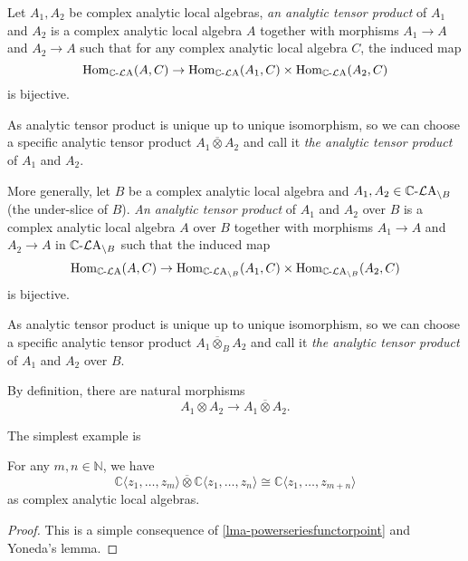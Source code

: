 \begin{definition}\label{def-analytictensor}
    Let $A_1,A_2$ be complex analytic local algebras, \emph{an analytic tensor product} of $A_1$ and $A_2$ is a complex analytic local algebra $A$ together with morphisms $A_1\rightarrow A$ and $A_2\rightarrow A$ such that for any complex analytic local algebra $C$, the induced map
    \[
      \operatorname{Hom}_{\mathbb{C}\text{-}\mathcal{L}\mathrm{A}}(A,C)\rightarrow  \operatorname{Hom}_{\mathbb{C}\text{-}\mathcal{L}\mathrm{A}}(A_1,C)\times  \operatorname{Hom}_{\mathbb{C}\text{-}\mathcal{L}\mathrm{A}}(A_2,C)
    \]
    is bijective.

    As analytic tensor product is unique up to unique isomorphism, so we can choose a specific analytic tensor product $A_1\overline{\otimes} A_2$ and call it \emph{the analytic tensor product} of $A_1$ and $A_2$.

    More generally, let $B$ be a complex analytic local algebra and $A_1,A_2\in \mathbb{C}\text{-}\mathcal{L}\mathrm{A}_{\backslash B}$ (the under-slice of $B$).
    \emph{An analytic tensor product} of $A_1$ and $A_2$ over $B$ is a complex analytic local algebra $A$ over $B$ together with morphisms $A_1\rightarrow A$ and $A_2\rightarrow A$ in $\mathbb{C}\text{-}\mathcal{L}\mathrm{A}_{\backslash B}$ such that the induced map
    \[
      \operatorname{Hom}_{\mathbb{C}\text{-}\mathcal{L}\mathrm{A}}(A,C)\rightarrow  \operatorname{Hom}_{\mathbb{C}\text{-}\mathcal{L}\mathrm{A}_{\backslash B}}(A_1,C)\times \operatorname{Hom}_{\mathbb{C}\text{-}\mathcal{L}\mathrm{A}_{\backslash B}}(A_2,C)
    \]
    is bijective.
    
    As analytic tensor product is unique up to unique isomorphism, so we can choose a specific analytic tensor product $A_1\overline{\otimes}_B A_2$ and call it \emph{the analytic tensor product} of $A_1$ and $A_2$ over $B$.
\end{definition}
By definition, there are natural morphisms 
\[
    A_1\otimes A_2\rightarrow A_1\overline{\otimes} A_2.
\]

The simplest example is 
\begin{lemma}\label{lma-Cmexistencetensor}
    For any $m,n\in \mathbb{N}$, we have
    \[
        \mathbb{C}\langle z_1,\ldots,z_m \rangle\overline{\otimes} \mathbb{C}\langle z_1,\ldots,z_n \rangle\cong  \mathbb{C}\langle z_1,\ldots,z_{m+n} \rangle
    \]
    as complex analytic local algebras.
\end{lemma}
\begin{proof}
    This is a simple consequence of \cref{lma-powerseriesfunctorpoint} and Yoneda's lemma.    
\end{proof}

